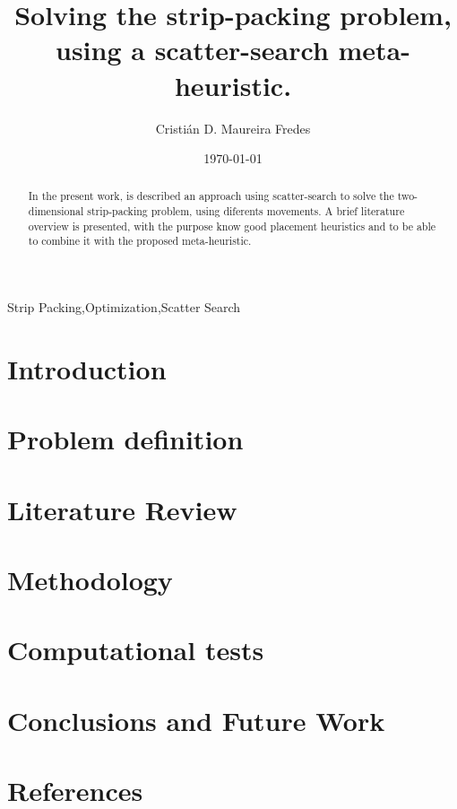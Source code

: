 \documentclass[preprint,authoryear,12pt]{elsarticle}
\begin{document}
\begin{frontmatter}

\title{Solving the strip-packing problem, using a scatter-search meta-heuristic.}
\author[utfsm]{Cristián D. Maureira Fredes}


\address[utfsm]{Departamento de Informática, Universidad Técnica Federico Santa María, Av. España 1680, Valparaiso, Chile}
\date{\today}

\begin{abstract}
In the present work, is described an approach using scatter-search
to solve the two-dimensional strip-packing problem,
using diferents movements.
A brief literature overview is presented,
with the purpose know good placement heuristics and
to be able to combine it with the proposed meta-heuristic.
\end{abstract}

\begin{keyword}
Strip Packing\sep Optimization\sep Scatter Search
\end{keyword}

\end{frontmatter}

\section{Introduction}
\label{introduction}


\section{Problem definition}
\label{problem}


\section{Literature Review}
\label{stateofart}


\section{Methodology}
\label{methodology}


\section{Computational tests}
\label{tests}


\section{Conclusions and Future Work}
\label{conclusions}


\section*{References}
%


\end{document}
